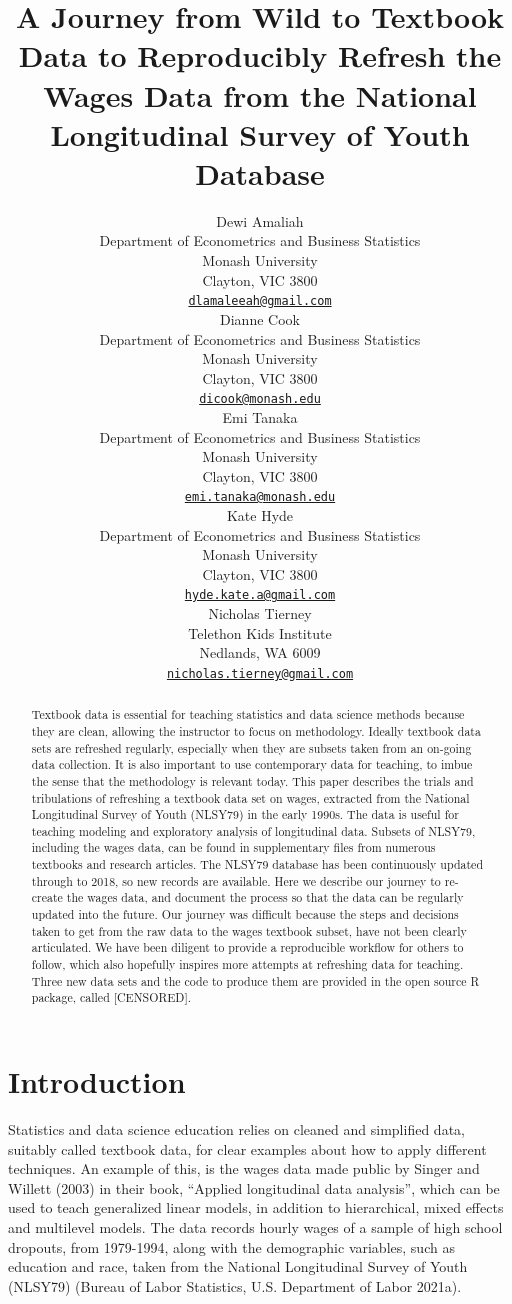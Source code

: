 \documentclass{article}
\title{A Journey from Wild to Textbook Data to Reproducibly Refresh the Wages Data from the National Longitudinal Survey of Youth Database}
\author{
    Dewi Amaliah
   \\
    Department of Econometrics and Business Statistics \\
    Monash University \\
  Clayton, VIC 3800 \\
  \texttt{\href{mailto:dlamaleeah@gmail.com}{\nolinkurl{dlamaleeah@gmail.com}}} \\
   \And
    Dianne Cook
   \\
    Department of Econometrics and Business Statistics \\
    Monash University \\
  Clayton, VIC 3800 \\
  \texttt{\href{mailto:dicook@monash.edu}{\nolinkurl{dicook@monash.edu}}} \\
   \And
    Emi Tanaka
   \\
    Department of Econometrics and Business Statistics \\
    Monash University \\
  Clayton, VIC 3800 \\
  \texttt{\href{mailto:emi.tanaka@monash.edu}{\nolinkurl{emi.tanaka@monash.edu}}} \\
   \And
    Kate Hyde
   \\
    Department of Econometrics and Business Statistics \\
    Monash University \\
  Clayton, VIC 3800 \\
  \texttt{\href{mailto:hyde.kate.a@gmail.com}{\nolinkurl{hyde.kate.a@gmail.com}}} \\
   \And
    Nicholas Tierney
   \\
    Telethon Kids Institute \\
  Nedlands, WA 6009 \\
  \texttt{\href{mailto:nicholas.tierney@gmail.com}{\nolinkurl{nicholas.tierney@gmail.com}}} \\
  }
\begin{document}
\maketitle

\def\tightlist{}


\begin{abstract}
Textbook data is essential for teaching statistics and data science methods because they are clean, allowing the instructor to focus on methodology. Ideally textbook data sets are refreshed regularly, especially when they are subsets taken from an on-going data collection. It is also important to use contemporary data for teaching, to imbue the sense that the methodology is relevant today. This paper describes the trials and tribulations of refreshing a textbook data set on wages, extracted from the National Longitudinal Survey of Youth (NLSY79) in the early 1990s. The data is useful for teaching modeling and exploratory analysis of longitudinal data. Subsets of NLSY79, including the wages data, can be found in supplementary files from numerous textbooks and research articles. The NLSY79 database has been continuously updated through to 2018, so new records are available. Here we describe our journey to re-create the wages data, and document the process so that the data can be regularly updated into the future. Our journey was difficult because the steps and decisions taken to get from the raw data to the wages textbook subset, have not been clearly articulated. We have been diligent to provide a reproducible workflow for others to follow, which also hopefully inspires more attempts at refreshing data for teaching. Three new data sets and the code to produce them are provided in the open source R package, called {[}CENSORED{]}.
\end{abstract}


\hypertarget{intro}{%
\section{Introduction}\label{intro}}

Statistics and data science education relies on cleaned and simplified data, suitably called textbook data, for clear examples about how to apply different techniques. An example of this, is the wages data made public by Singer and Willett (2003) in their book, ``Applied longitudinal data analysis'', which can be used to teach generalized linear models, in addition to hierarchical, mixed effects and multilevel models. The data records hourly wages of a sample of high school dropouts, from 1979-1994, along with the demographic variables, such as education and race, taken from the National Longitudinal Survey of Youth (NLSY79) (Bureau of Labor Statistics, U.S. Department of Labor 2021a).
\end{document}
